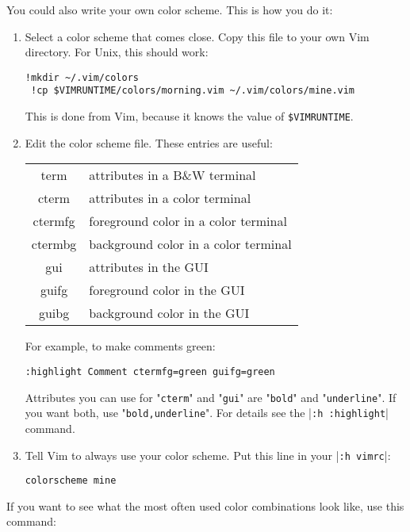 You could also write your own color scheme.
This is how you do it:
\begin{enumerate}
				\item Select a color scheme that comes close.
								Copy this file to your own Vim directory.
								For Unix, this should work:

								\begin{Verbatim}[samepage=true]
 !mkdir ~/.vim/colors
 !cp $VIMRUNTIME/colors/morning.vim ~/.vim/colors/mine.vim
 \end{Verbatim}

								This is done from Vim, because it knows the value of \verb!$VIMRUNTIME!.

				\item Edit the color scheme file.
								These entries are useful:

								\begin{tabular}{c l}
												term & attributes in a B\&W terminal\\
												cterm & attributes in a color terminal\\
												ctermfg & foreground color in a color terminal\\
												ctermbg & background color in a color terminal\\
												gui & attributes in the GUI\\
												guifg & foreground color in the GUI\\
												guibg & background color in the GUI\\
								\end{tabular}

								For example, to make comments green:

								\begin{Verbatim}[samepage=true]
 :highlight Comment ctermfg=green guifg=green
								\end{Verbatim}

								Attributes you can use for "\verb!cterm!" and "\verb!gui!" are "\verb!bold!" and "\verb!underline!".
								If you want both, use "\verb!bold,underline!".
								For details see the |\verb!:h :highlight!| command.

				\item Tell Vim to always use your color scheme.
								Put this line in your |\verb!:h vimrc!|:

								\begin{Verbatim}[samepage=true]
 colorscheme mine
 \end{Verbatim}

\end{enumerate}
If you want to see what the most often used color combinations look like, use this command:

